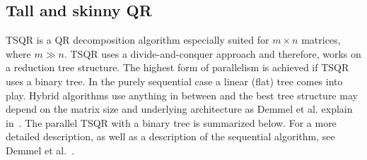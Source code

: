 \documentclass{scrartcl}
\numberwithin{equation}{section}
\begin{document}
\subsection{Tall and skinny QR}
TSQR is a QR decomposition algorithm especially suited for $m \times n$ matrices, where $m \gg n$. TSQR uses a divide-and-conquer approach and therefore, works on a reduction tree structure. The highest form of parallelism is achieved if TSQR uses a binary tree. In the purely sequential case a linear (flat) tree comes into play. Hybrid algorithms use anything in between and the best tree structure may depend on the matrix size and underlying architecture as Demmel et al. explain in~\cite{Demmel:2012:CA-QR_demmel}. The parallel TSQR with a binary tree is summarized below. For a more detailed description, as well as a description of the sequential algorithm, see Demmel et al.~\cite{Demmel:2012:CA-QR_demmel}.
\end{document}

